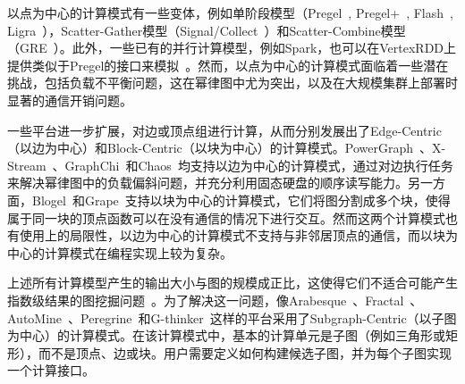 以点为中心的计算模式有一些变体，例如单阶段模型（Pregel~\cite{malewicz2010pregel}, Pregel+~\cite{yan2015effective}, Flash~\cite{10184838}, Ligra~\cite{DBLP:conf/ppopp/ShunB13}），Scatter-Gather模型（Signal/Collect~\cite{stutz2010signal}）和Scatter-Combine模型（GRE~\cite{yan2014pregel}）。此外，一些已有的并行计算模型，例如Spark，也可以在VertexRDD上提供类似于Pregel的接口来模拟~\cite{gonzalez2014graphx}。然而，以点为中心的计算模式面临着一些潜在挑战，包括负载不平衡问题，这在幂律图中尤为突出，以及在大规模集群上部署时显著的通信开销问题。

一些平台进一步扩展，对边或顶点组进行计算，从而分别发展出了Edge-Centric（以边为中心）和Block-Centric（以块为中心）的计算模式。PowerGraph~\cite{gonzalez2012powergraph}、X-Stream~\cite{roy2013x}、GraphChi~\cite{kyrola2012graphchi}和Chaos~\cite{roy2015chaos}均支持以边为中心的计算模式，通过对边执行任务来解决幂律图中的负载偏斜问题，并充分利用固态硬盘的顺序读写能力。另一方面，Blogel~\cite{yan2014blogel}和Grape~\cite{fan2017grape}支持以块为中心的计算模式，它们将图分割成多个块，使得属于同一块的顶点函数可以在没有通信的情况下进行交互。然而这两个计算模式也有使用上的局限性，以边为中心的计算模式不支持与非邻居顶点的通信，而以块为中心的计算模式在编程实现上较为复杂。

上述所有计算模型产生的输出大小与图的规模成正比，这使得它们不适合可能产生指数级结果的图挖掘问题~\cite{yan2017big, yan2024systems}。为了解决这一问题，像Arabesque~\cite{teixeira2015arabesque}、Fractal~\cite{dias2019fractal}、AutoMine~\cite{mawhirter2019automine}、Peregrine~\cite{jamshidi2020peregrine}和G-thinker~\cite{yan2020g}这样的平台采用了Subgraph-Centric（以子图为中心）的计算模式。在该计算模式中，基本的计算单元是子图（例如三角形或矩形），而不是顶点、边或块。用户需要定义如何构建候选子图，并为每个子图实现一个计算接口。




